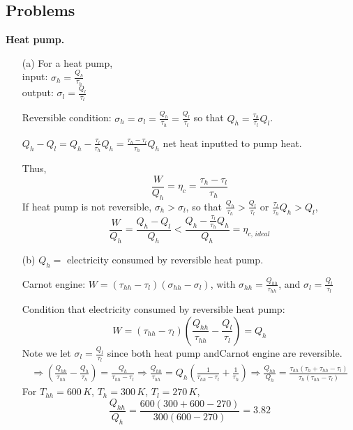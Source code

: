 \documentclass[twoside]{amsart}
\theoremstyle{plain}
\theoremstyle{definition}
\newcommand{\solutionhead}[1]
  {
   \noindent{\small\bf Solution #1.}
   }
\begin{document}
\subsection*{Problems}

\solutionhead{1} \textbf{Heat pump.} \begin{itemize}
\item[(a)] For a heat pump, \\
input: $\sigma_h = \frac{Q_h}{\tau_h}$ \\
output: $\sigma_l = \frac{ Q_l}{\tau_l}$

Reversible condition: $\sigma_h = \sigma_l = \frac{Q_h}{\tau_h} =  \frac{Q_l}{ \tau_l}$  so that $Q_h = \frac{\tau_h}{\tau_l} Q_l$.  

$Q_h - Q_l = Q_h - \frac{ \tau_l}{\tau_h} Q_h = \frac{\tau_h - \tau_l }{\tau_h } Q_h $ net heat inputted to pump heat.  

Thus,
\[
\frac{W}{Q_h} = \eta_c = \frac{ \tau_h - \tau_l }{\tau_h}
\]
If heat pump is not reversible, $\sigma_h > \sigma_l$, so that $\frac{Q_h}{\tau_h } > \frac{ Q_l}{\tau_l}$ or $\frac{ \tau_l }{ \tau_h } Q_h > Q_l$,
\[
\frac{W}{Q_h} = \frac{Q_h - Q_l }{Q_h } < \frac{Q_h - \frac{\tau_l}{\tau_h} Q_h }{ Q_h } = \eta_{c,\, ideal}
\]
\item[(b)] $Q_h = $ electricity consumed by reversible heat pump.  

Carnot engine: $W = (\tau_{hh} - \tau_l)(\sigma_{hh} - \sigma_l)$, with $\sigma_{hh} = \frac{Q_{hh}}{\tau_{hh}}$, and $\sigma_l = \frac{Q_l}{\tau_l}$

Condition that electricity consumed by reversible heat pump:
\[
W = (\tau_{hh} - \tau_l) \left( \frac{ Q_{hh} }{\tau_{hh}} - \frac{Q_l}{ \tau_l } \right) = Q_h 
\]
Note we let $\sigma_l = \frac{Q_l}{\tau_l}$ since both heat pump andCarnot engine are reversible.  
\[
\begin{gathered}
 \Longrightarrow  \left( \frac{ Q_{hh}}{\tau_{hh}} - \frac{Q_h}{\tau_h} \right) = \frac{Q_h}{ \tau_{hh} - \tau_l}  \Longrightarrow   \frac{ Q_{hh}}{\tau_{hh}} = Q_h \left( \frac{1}{ \tau_{hh} - \tau_l } + \frac{1}{\tau_h} \right) \Longrightarrow \boxed{ \frac{ Q_{hh}}{ Q_h}  = \frac{ \tau_{hh} (\tau_h + \tau_{hh} - \tau_l )}{ \tau_h ( \tau_{hh} - \tau_l ) } }
\end{gathered}
\]
For $T_{hh} = 600 \, K$, $T_h = 300 \, K$, $T_l = 270 \, K$, 
\[
\frac{Q_{hh}}{Q_h} = \frac{ 600 (300 + 600 - 270) }{ 300 (600 - 270) } = 3.82
\]


\end{itemize}
\end{document}
